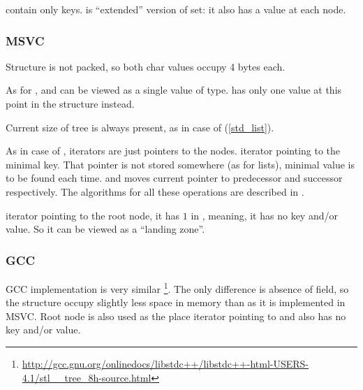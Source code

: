  contain only keys.
 is ``extended'' version of set: it also has a value at each node.

\subsubsection{MSVC}





Structure is not packed, so both char values occupy 4 bytes each.

As for ,  and  can be viewed as a single value of  type.
 has only one value at this point in the structure instead.

Current size of tree is always present, as in case of  (\ref{std_list}).

As in case of , iterators are just pointers to the nodes.
 iterator pointing to the minimal key.
That pointer is not stored somewhere (as for lists), minimal value is to be found each time.
 and  moves current pointer to predecessor and successor respectively.
The algorithms for all these operations are described in \cite{Cormen:2009:IAT:1614191}.

 iterator pointing to the root node, it has $1$ in , meaning, it has no key and/or value.
So it can be viewed as a ``landing zone''.

\subsubsection{GCC}





GCC implementation is very similar
\footnote{\url{http://gcc.gnu.org/onlinedocs/libstdc++/libstdc++-html-USERS-4.1/stl__tree_8h-source.html}}.
The only difference is absence of  field,
so the structure occupy slightly less space in memory than as it is implemented in MSVC.
Root node is also used as the place  iterator pointing to and also has no key and/or value.

